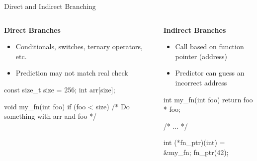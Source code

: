 \documentclass[10pt, dvipsnames, aspectratio=169]{beamer}
\begin{document}
\begin{frame}[c,fragile]{Direct and Indirect Branching}
  \begin{columns}
    \begin{column}[t]{0.5\textwidth}
      {\bf\color{blue}\Large Direct Branches}
      \begin{itemize}
        \item Conditionals, switches, ternary operators, etc.
        \item Prediction may not match real check
      \end{itemize}

      \vspace{1em}
      \begin{listing}[language=c,gobble=8,xleftmargin=5em]
        const size_t size = 256;
        int arr[size];

        void my_fn(int foo) {
            if (foo < size) {
                /* Do something with arr and foo */
            }
        }
      \end{listing}
    \end{column}

    \begin{column}[t]{0.5\textwidth}
      {\bf\color{orange}\Large Indirect Branches}
      \begin{itemize}
        \item Call based on function pointer (address)
        \item Predictor can guess an incorrect address
      \end{itemize}

      \vspace{1em}
      \begin{listing}[language=c,gobble=8,xleftmargin=5em]
        int my_fn(int foo) {
            return foo * foo;
        }

        /* ... */

        int (*fn_ptr)(int) = &my_fn;
        fn_ptr(42);
      \end{listing}
    \end{column}
  \end{columns}
\end{frame}
\end{document}
